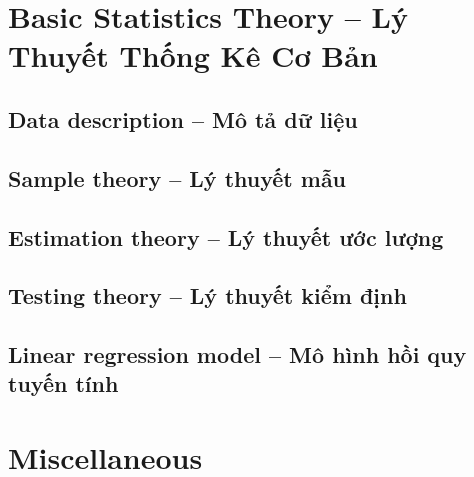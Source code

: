 \documentclass{article}
\begin{document}

\section{Basic Statistics Theory -- Lý Thuyết Thống Kê Cơ Bản}

\subsection{Data description -- Mô tả dữ liệu}


\subsection{Sample theory -- Lý thuyết mẫu}


\subsection{Estimation theory -- Lý thuyết ước lượng}


\subsection{Testing theory -- Lý thuyết kiểm định}


\subsection{Linear regression model -- Mô hình hồi quy tuyến tính}


\section{Miscellaneous}


\printbibliography[heading=bibintoc]
	
\end{document}
